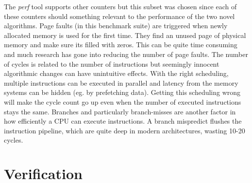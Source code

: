 \documentclass[a4paper,oneside]{memoir}
\begin{document}
The \emph{perf} tool supports other counters but this subset was chosen since
each of these counters should something relevant to the performance of the two
novel algorithms. Page faults (in this benchmark suite) are triggered when newly
allocated memory is used for the first time. They find an unused page of physical
memory and make sure its filled with zeros. This can be quite time consuming
and much research has gone into reducing the number of page faults.\cite{Nakashima:1995,Chase:1987,Moon:1984,Grunwald:1993}
The number of cycles is related to the number of instructions but seemingly
innocent algorithmic changes can have unintuitive effects. With the right
scheduling, multiple instructions can be executed in parallel and latency from
the memory systems can be hidden (eg. by prefetching data). Getting this scheduling
wrong will make the cycle count go up even when the number of executed instructions
stays the same. Branches and particularly branch-misses are another factor in
how efficiently a CPU can execute instructions. A branch mispredict flushes the
instruction pipeline, which are quite deep in modern architectures, wasting
10-20 cycles.\cite{Drepper}

\section{Verification}
\end{document}
